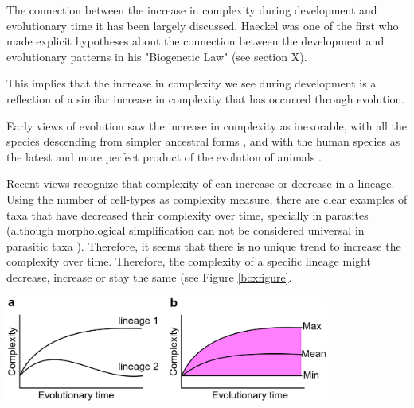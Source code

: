 \begin{mdframed}[style=boxstyle,frametitle={Box1. On the relationship between the increase of complexity in Evolution and Development}]\label{Box1:Evo_complexity}

The connection between the increase in complexity during development and evolutionary time it has been largely discussed.
Haeckel was one of the first who made explicit hypotheses about the connection between the development and evolutionary patterns in his "Biogenetic Law" (see section X).

This implies that the increase in complexity we see during development is a reflection of a similar increase in complexity that has occurred through evolution.

Early views of evolution saw the increase in complexity as inexorable, with all the species descending from simpler ancestral forms \citep{lamarck1809zoo,haeckel1874menschen}, and with the human species as the latest and more perfect product of the evolution of animals \citep{haeckel1874menschen}.


Recent views recognize that complexity of can increase or decrease in a lineage.
Using the number of cell-types as complexity measure, there are clear examples of taxa that have decreased their complexity over time, specially in parasites \citep{Canning2003,Arthur2010} (although morphological simplification can not be considered universal in parasitic taxa \citealp{poulin2011evolutionary}). Therefore, it seems that there is no unique trend to increase the complexity over time. Therefore, the complexity of a specific lineage might decrease, increase or stay the same (see Figure \ref{boxfigure}.
\par
{\centering
  \includegraphics[width=0.8\textwidth]{./Images/complexity_min.jpeg}
  \centering
\label{boxfigure}
}
\par


\end{mdframed}
